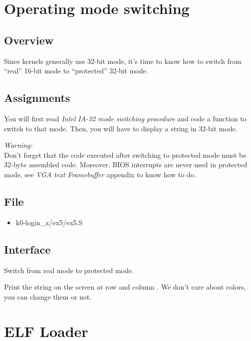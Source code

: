 %
%

\newpage

\section{Operating mode switching}

\subsection*{Overview}
Since kernels generally use 32-bit mode, it's time to know how to switch from
``real'' 16-bit mode to ``protected'' 32-bit mode.

\subsection*{Assignments}
You will first read \emph{Intel IA-32 mode switching procedure} and code a
function to switch to that mode. Then, you will have to display a string in
32-bit mode.

{\em Warning:}\\
Don't forget that the code executed after switching to protected mode must be
32-byte assembled code. Moreover, BIOS interrupts are never used in protected
mode, see \emph{VGA text Framebuffer} appendix to know how to do.

\subsection*{File}
\begin{itemize}
  \item k0-login\_x/ex5/ex5.S
\end{itemize}

\subsection*{Interface}
{
  Switch from real mode to protected mode.
}

{
  Print the string  on the screen at row 
  and column . We don't care about colors, you can change them
  or not.
}

%
%

\newpage

\section{ELF Loader}

